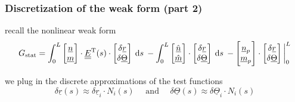 \begin{frame}
  \frametitle{Discretization of the weak form (part 2)}

  recall the nonlinear weak form
  \begin{displaymath}
    G_{\text{stat}} = 
      \int_0^L
        \begin{bmatrix}
          \underline{n} \\ \underline{m}
        \end{bmatrix}
        \cdot \doubleunderline{E}^{\mathrm{T}}(s) \cdot
        \begin{bmatrix}
          \delta \underline{r} \\ \delta \underline{\Theta}
        \end{bmatrix}
      \: \dif s \:
      - \int_0^L
        \begin{bmatrix}
          \underline{\hat{n}} \\ \underline{\hat{m}}
        \end{bmatrix} \cdot
        \begin{bmatrix}
          \delta \underline{r} \\ \delta \underline{\Theta}
        \end{bmatrix}
      \: \dif s \:
      - \begin{bmatrix}
          \underline{n}_p \\ \underline{m}_p
      \end{bmatrix} \cdot
      \begin{bmatrix}
          \delta \underline{r} \\ \delta \underline{\Theta}
      \end{bmatrix}
      \sVert[3]_0^L
  \end{displaymath}
  
  \vspace{1em}
  we plug in the discrete approximations of the test functions
  \begin{displaymath}
    \delta \underline{r}(s) \approx \delta \underline{r}_i \cdot N_i(s)
    \quad \text{ and } \quad
    \delta \underline{\Theta}(s) \approx \delta \underline{\Theta}_i \cdot N_i(s)
  \end{displaymath}
  

\end{frame}
